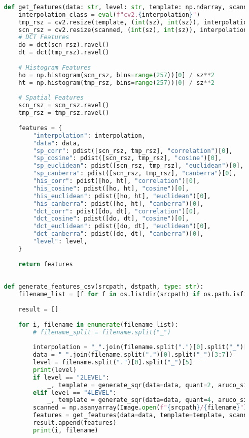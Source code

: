 \begin{lstlisting}[language=Python]
    
    def get_features(data: str, level: str, template: np.ndarray, scanned: np.ndarray, interpolation: str, sz: int = 400):
        interpolation_class = eval(f"cv2.{interpolation}")
        tmp_rsz = cv2.resize(template, (int(sz), int(sz)), interpolation=interpolation_class).astype(float)
        scn_rsz = cv2.resize(scanned, (int(sz), int(sz)), interpolation=interpolation_class).astype(float)
        # DCT Features
        do = dct(scn_rsz).ravel()
        dt = dct(tmp_rsz).ravel()
    
        # Histogram Features
        ho = np.histogram(scn_rsz, bins=range(257))[0] / sz**2
        ht = np.histogram(tmp_rsz, bins=range(257))[0] / sz**2
    
        # Spatial Features
        scn_rsz = scn_rsz.ravel()
        tmp_rsz = tmp_rsz.ravel()
    
        features = {
            "interpolation": interpolation,
            "data": data,
            "sp_corr": pdist([scn_rsz, tmp_rsz], "correlation")[0],
            "sp_cosine": pdist([scn_rsz, tmp_rsz], "cosine")[0],
            "sp_euclidean": pdist([scn_rsz, tmp_rsz], "euclidean")[0],
            "sp_canberra": pdist([scn_rsz, tmp_rsz], "canberra")[0],
            "his_corr": pdist([ho, ht], "correlation")[0],
            "his_cosine": pdist([ho, ht], "cosine")[0],
            "his_euclidean": pdist([ho, ht], "euclidean")[0],
            "his_canberra": pdist([ho, ht], "canberra")[0],
            "dct_corr": pdist([do, dt], "correlation")[0],
            "dct_cosine": pdist([do, dt], "cosine")[0],
            "dct_euclidean": pdist([do, dt], "euclidean")[0],
            "dct_canberra": pdist([do, dt], "canberra")[0],
            "level": level,
        }
    
        return features
    
    
    def generate_features_csv(srcpath, dstpath, type: str):
        filename_list = [f for f in os.listdir(srcpath) if os.path.isfile(srcpath + "/" + f) and srcpath + "/" + f != f"{srcpath}/.DS_Store"]
    
        result = []
    
        for i, filename in enumerate(filename_list):
            # filename_split = filename.split("_")
    
            interpolation = "_".join(filename.split(".")[0].split("_")[1:3])
            data = "_".join(filename.split(".")[0].split("_")[3:7])
            level = filename.split(".")[0].split("_")[5]
            print(level)
            if level == "2LEVEL":
                _, template = generate_sqr(data=data, quant=2, aruco_size=30)
            elif level == "4LEVEL":
                _, template = generate_sqr(data=data, quant=4, aruco_size=30)
            scanned = np.asanyarray(Image.open(f"{srcpath}/{filename}").convert("L"))
            features = get_features(data=data, template=template, scanned=scanned, interpolation=interpolation, level=level)
            result.append(features)
            print(i, filename)
    

\end{lstlisting}
